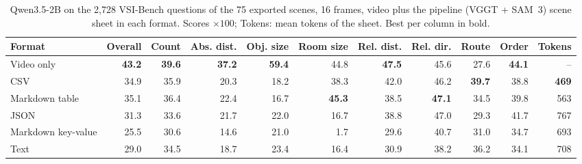\begin{table}[t]
\centering
\small
\begin{tabular}{lrrrrrrrrrr}
\toprule
Format & Overall & Count & Abs. dist. & Obj. size & Room size & Rel. dist. & Rel. dir. & Route & Order & Tokens \\
\midrule
Video only & \textbf{43.2} & \textbf{39.6} & \textbf{37.2} & \textbf{59.4} & 44.8 & \textbf{47.5} & 45.6 & 27.6 & \textbf{44.1} & -- \\
\midrule
CSV & 34.9 & 35.9 & 20.3 & 18.2 & 38.3 & 42.0 & 46.2 & \textbf{39.7} & 38.8 & \textbf{469} \\
Markdown table & 35.1 & 36.4 & 22.4 & 16.7 & \textbf{45.3} & 38.5 & \textbf{47.1} & 34.5 & 39.8 & 563 \\
JSON & 31.3 & 33.6 & 21.7 & 22.0 & 16.7 & 38.8 & 47.0 & 29.3 & 41.7 & 767 \\
Markdown key-value & 25.5 & 30.6 & 14.6 & 21.0 & 1.7 & 29.6 & 40.7 & 31.0 & 34.7 & 693 \\
Text & 29.0 & 34.5 & 18.7 & 23.4 & 16.4 & 30.9 & 38.2 & 36.2 & 34.1 & 708 \\
\bottomrule
\end{tabular}
\caption{Qwen3.5-2B on the 2{,}728 VSI-Bench questions of the 75 exported scenes, 16 frames, video plus the pipeline (VGGT + SAM~3) scene sheet in each format. Scores $\times 100$; Tokens: mean tokens of the sheet. Best per column in bold.}
\label{tab:sheet-format}
\end{table}

